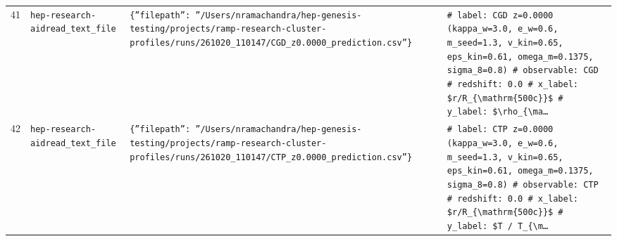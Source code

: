 \documentclass[11pt,a4paper]{article}
\begin{document}
\begin{longtable}{@{}p{}p{}p{}p{}@{}}
41 & \texttt{hep-research-aid}\newline\texttt{read\_\allowbreak{}text\_\allowbreak{}file} & \texttt{\{''filepath'':\allowbreak{} ''/\allowbreak{}Users/\allowbreak{}nramachandra/\allowbreak{}hep-genesis-testing/\allowbreak{}projects/\allowbreak{}ramp-research-cluster-profiles/\allowbreak{}runs/\allowbreak{}261020\_\allowbreak{}110147/\allowbreak{}CGD\_\allowbreak{}z0.0000\_\allowbreak{}prediction.csv''\}\allowbreak{}} & \texttt{\# label:\allowbreak{} CGD z=\allowbreak{}0.0000 (kappa\_\allowbreak{}w=\allowbreak{}3.0,\allowbreak{} e\_\allowbreak{}w=\allowbreak{}0.6,\allowbreak{} m\_\allowbreak{}seed=\allowbreak{}1.3,\allowbreak{} v\_\allowbreak{}kin=\allowbreak{}0.65,\allowbreak{} eps\_\allowbreak{}kin=\allowbreak{}0.61,\allowbreak{} omega\_\allowbreak{}m=\allowbreak{}0.1375,\allowbreak{} sigma\_\allowbreak{}8=\allowbreak{}0.8)\allowbreak{} \# observable:\allowbreak{} CGD \# redshift:\allowbreak{} 0.0 \# x\_\allowbreak{}label:\allowbreak{} \$r/\allowbreak{}R\_\allowbreak{}\{\textbackslash{}\allowbreak{}mathrm\{500c\}\allowbreak{}\}\allowbreak{}\$ \# y\_\allowbreak{}label:\allowbreak{} \$\textbackslash{}\allowbreak{}rho\_\allowbreak{}\{\textbackslash{}\allowbreak{}ma\ldots{}\allowbreak{}} \\
42 & \texttt{hep-research-aid}\newline\texttt{read\_\allowbreak{}text\_\allowbreak{}file} & \texttt{\{''filepath'':\allowbreak{} ''/\allowbreak{}Users/\allowbreak{}nramachandra/\allowbreak{}hep-genesis-testing/\allowbreak{}projects/\allowbreak{}ramp-research-cluster-profiles/\allowbreak{}runs/\allowbreak{}261020\_\allowbreak{}110147/\allowbreak{}CTP\_\allowbreak{}z0.0000\_\allowbreak{}prediction.csv''\}\allowbreak{}} & \texttt{\# label:\allowbreak{} CTP z=\allowbreak{}0.0000 (kappa\_\allowbreak{}w=\allowbreak{}3.0,\allowbreak{} e\_\allowbreak{}w=\allowbreak{}0.6,\allowbreak{} m\_\allowbreak{}seed=\allowbreak{}1.3,\allowbreak{} v\_\allowbreak{}kin=\allowbreak{}0.65,\allowbreak{} eps\_\allowbreak{}kin=\allowbreak{}0.61,\allowbreak{} omega\_\allowbreak{}m=\allowbreak{}0.1375,\allowbreak{} sigma\_\allowbreak{}8=\allowbreak{}0.8)\allowbreak{} \# observable:\allowbreak{} CTP \# redshift:\allowbreak{} 0.0 \# x\_\allowbreak{}label:\allowbreak{} \$r/\allowbreak{}R\_\allowbreak{}\{\textbackslash{}\allowbreak{}mathrm\{500c\}\allowbreak{}\}\allowbreak{}\$ \# y\_\allowbreak{}label:\allowbreak{} \$T /\allowbreak{} T\_\allowbreak{}\{\textbackslash{}\allowbreak{}m\ldots{}\allowbreak{}} \\

\end{longtable}
\end{document}

